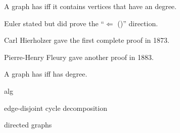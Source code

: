 \begin{frame}{}
  \begin{theorem}
    A graph has  iff
    it contains  vertices that have an  degree.
  \end{theorem}

  \pause
  \vspace{0.60cm}
  \begin{center}
    Euler stated but did 
    prove the ``$\Longleftarrow$ ({\it {}})'' direction.

    \pause
    \vspace{0.60cm}
    Carl Hierholzer  gave the first complete proof in 1873.

    \pause
    \vspace{0.60cm}
    Pierre-Henry Fleury gave another proof in 1883.
  \end{center}
\end{frame}

\begin{frame}{}
  \begin{theorem}
    A  graph has  iff
     has  degree.
  \end{theorem}

  \pause
\end{frame}

\begin{frame}{}
  alg
\end{frame}

\begin{frame}{}
  edge-disjoint cycle decomposition
\end{frame}

\begin{frame}{}
  directed graphs
\end{frame}
